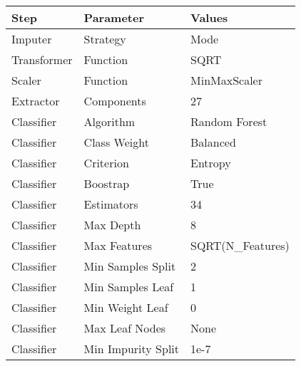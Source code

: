\begin{tabular}{lll} \toprule
Step            & Parameter             & Values                        \\ \midrule
Imputer         & Strategy              & Mode                          \\
Transformer     & Function              & SQRT                          \\
Scaler          & Function              & MinMaxScaler                  \\
Extractor       & Components            & 27                            \\
Classifier      & Algorithm             & Random Forest                 \\
Classifier      & Class Weight          & Balanced                      \\
Classifier      & Criterion             & Entropy                       \\
Classifier      & Boostrap              & True                          \\
Classifier      & Estimators            & 34                            \\
Classifier      & Max Depth             & 8                             \\
Classifier      & Max Features          & SQRT(N\_Features)             \\
Classifier      & Min Samples Split     & 2                             \\
Classifier      & Min Samples Leaf      & 1                             \\
Classifier      & Min Weight Leaf       & 0                             \\
Classifier      & Max Leaf Nodes        & None                          \\
Classifier      & Min Impurity Split    & 1e-7                          \\
\bottomrule \end{tabular}
